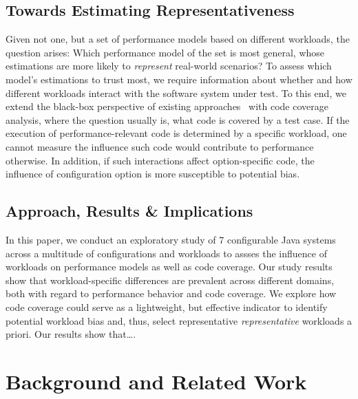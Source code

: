 \subsection*{Towards Estimating Representativeness}
Given not one, but a set of performance models based on different workloads, the question arises: Which performance model of the set is most general, whose estimations are more likely to \emph{represent} real-world scenarios? 
To assess which model's estimations to trust most, we require information about whether and how different workloads interact with the software system under test. 
To this end, we extend the black-box perspective of existing approaches~\cite{dorn2020,siegmundPerformanceinfluenceModelsHighly2015,haDeepPerf2019,perfAL,guoVariabilityawarePerformancePrediction2013,sarkarCostEfficientSamplingPerformance,guo_2018_data,fourier_learning_2015,perLasso} with code coverage analysis, where the question usually is, what code is covered by a test case.
If the execution of performance-relevant code is determined by a specific workload, one cannot measure the influence such code would contribute to performance otherwise.
In addition, if such interactions affect option-specific code, the influence of configuration option is more susceptible to potential bias. 

\subsection*{Approach, Results \& Implications}
In this paper, we conduct an exploratory study of {\color{red}7} configurable Java systems across a multitude of configurations and workloads to assses the influence of workloads on performance models as well as code coverage. 
Our study results show that workload-specific differences are prevalent across different domains, both with regard to performance behavior and code coverage. We explore how code coverage could serve as a lightweight, but effective indicator to identify potential workload bias and, thus, select representative \emph{representative} workloads a priori. Our results show that\ldots.


\section{Background and Related Work}
